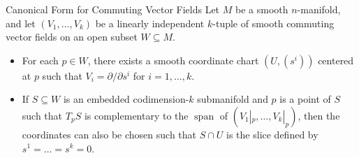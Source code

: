 \documentclass[../main.tex]{subfiles}
\begin{document}
\begin{theorem}{Canonical Form for Commuting Vector Fields}{}
Let $M$ be a smooth $n$-manifold, and let $(V_1, \dots, V_k)$ be a linearly independent $k$-tuple of smooth commuting vector fields on an open subset $W \subseteq M$. 
\begin{itemize}
    \item For each $p \in W$, there exists a smooth coordinate chart $(U, (s^i))$ centered at $p$ such that $V_i = \partial/\partial s^i$ for $i = 1, \dots, k$.
    \item  If $S \subseteq W$ is an embedded codimension-$k$ submanifold and $p$ is a point of $S$ such that $T_p S$ is complementary to the $\operatorname{span}$ of $(V_1|_p, \dots, V_k|_p)$, then the coordinates can also be chosen such that $S \cap U$ is the slice defined by $s^1 = \dots = s^k = 0$.
\end{itemize}

\end{theorem}
\end{document}
